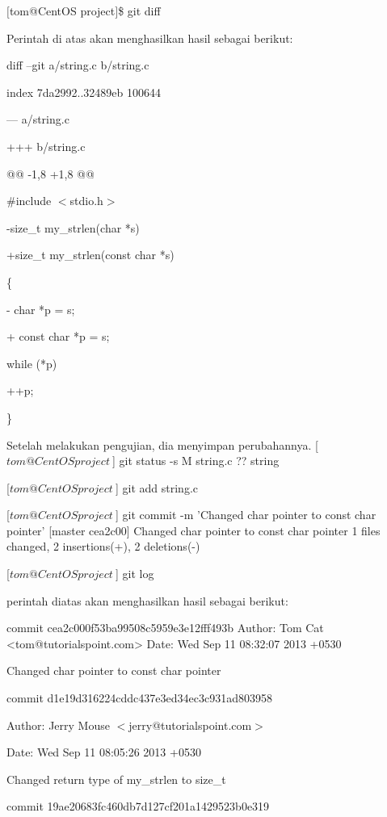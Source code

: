 $[$tom@CentOS project$]$\$ git diff\vspace{12pt}

Perintah di atas akan menghasilkan hasil sebagai berikut:\vspace{12pt}

diff --git a/string.c b/string.c

index 7da2992..32489eb 100644

--- a/string.c

+++ b/string.c

@@ -1,8 +1,8 @@

\#include $<$stdio.h$>$

-size\_t my\_strlen(char *s)

+size\_t my\_strlen(const char *s)

\{

 - char *p = s;

 + const char *p = s;

 while (*p)

 ++p;

\}\vspace{12pt}

Setelah melakukan pengujian, dia menyimpan perubahannya.\vspace{12pt}
[$tom@CentOS project ~$] git status -s
M string.c
?? string

[$tom@CentOS project ~$] git add string.c

[$tom@CentOS project ~$] git commit -m 'Changed char pointer to const char pointer'
[master cea2c00] Changed char pointer to const char pointer
1 files changed, 2 insertions(+), 2 deletions(-)

[$tom@CentOS project ~$] git log\vspace{12pt}

perintah diatas akan menghasilkan hasil sebagai berikut:\vspace{12pt}

commit cea2c000f53ba99508c5959e3e12fff493b
Author: Tom Cat <tom@tutorialspoint.com>
Date: Wed Sep 11 08:32:07 2013 +0530

Changed char pointer to const char pointer


commit d1e19d316224cddc437e3ed34ec3c931ad803958

Author: Jerry Mouse $<$jerry@tutorialspoint.com$>$

Date: Wed Sep 11 08:05:26 2013 +0530

Changed return type of my\_strlen to size\_t

commit 19ae20683fc460db7d127cf201a1429523b0e319

